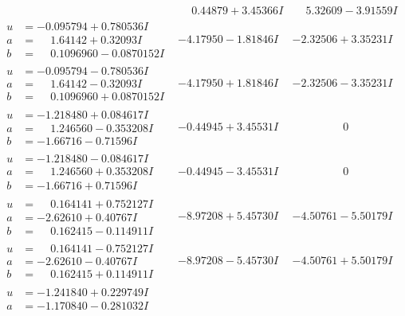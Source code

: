 \documentclass[1p]{elsarticle_modified}
\theoremstyle{definition}
\begin{document}
$$\begin{array}{c|c|c}
 & \phantom{-}0.44879 + 3.45366 I & \phantom{-}5.32609 - 3.91559 I \\ \hline\begin{aligned}
u &= -0.095794 + 0.780536 I \\
a &= \phantom{-}1.64142 + 0.32093 I \\
b &= \phantom{-}0.1096960 - 0.0870152 I\end{aligned}
 & -4.17950 - 1.81846 I & -2.32506 + 3.35231 I \\ \hline\begin{aligned}
u &= -0.095794 - 0.780536 I \\
a &= \phantom{-}1.64142 - 0.32093 I \\
b &= \phantom{-}0.1096960 + 0.0870152 I\end{aligned}
 & -4.17950 + 1.81846 I & -2.32506 - 3.35231 I \\ \hline\begin{aligned}
u &= -1.218480 + 0.084617 I \\
a &= \phantom{-}1.246560 - 0.353208 I \\
b &= -1.66716 - 0.71596 I\end{aligned}
 & -0.44945 + 3.45531 I & \phantom{-0.000000 } 0 \\ \hline\begin{aligned}
u &= -1.218480 - 0.084617 I \\
a &= \phantom{-}1.246560 + 0.353208 I \\
b &= -1.66716 + 0.71596 I\end{aligned}
 & -0.44945 - 3.45531 I & \phantom{-0.000000 } 0 \\ \hline\begin{aligned}
u &= \phantom{-}0.164141 + 0.752127 I \\
a &= -2.62610 + 0.40767 I \\
b &= \phantom{-}0.162415 - 0.114911 I\end{aligned}
 & -8.97208 + 5.45730 I & -4.50761 - 5.50179 I \\ \hline\begin{aligned}
u &= \phantom{-}0.164141 - 0.752127 I \\
a &= -2.62610 - 0.40767 I \\
b &= \phantom{-}0.162415 + 0.114911 I\end{aligned}
 & -8.97208 - 5.45730 I & -4.50761 + 5.50179 I \\ \hline\begin{aligned}
u &= -1.241840 + 0.229749 I \\
a &= -1.170840 - 0.281032 I \\

\end{aligned}
\end{array}$$
\end{document}
